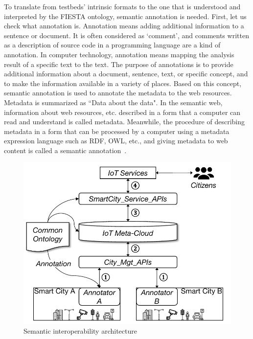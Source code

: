 To translate from testbeds' intrinsic formats to the one that is understood and interpreted by the FIESTA ontology, semantic annotation is needed. First, let us check what annotation is. Annotation means adding additional information to a sentence or document. It is often considered as ‘comment’, and comments written as a description of source code in a programming language are a kind of annotation. In computer technology, annotation means mapping the analysis result of a specific text to the text. The purpose of annotations is to provide additional information about a document, sentence, text, or specific concept, and to make the information available in a variety of places. Based on this concept, semantic annotation is used to annotate the metadata to the web resources. Metadata is summarized as ``Data about the data". In the semantic web, information about web resources, etc. described in a form that a computer can read and understand is called metadata. Meanwhile, the procedure of describing metadata in a form that can be processed by a computer using a metadata expression language such as RDF, OWL, etc., and giving metadata to web content is called a semantic annotation~\cite{kiryakov2004semantic, euzenat2002eight}.

\begin{figure}[H]			%
	\centering
	\includegraphics[width=\textwidth]{figures/fig_iwm3_semantic_interworking_interop.pdf}
    \caption{Semantic interoperability architecture}
    \label{fig:semantic_interoperability_architecture_iwm3}
\end{figure}

